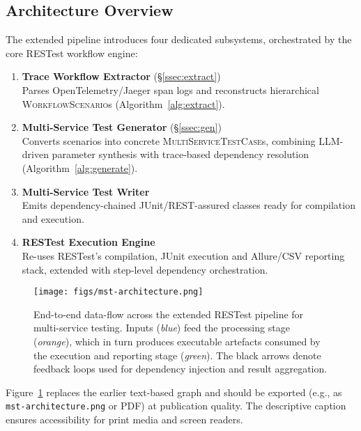 \subsection{Architecture Overview}\label{ssec:arch}
The extended pipeline introduces four dedicated subsystems, orchestrated by
the core RESTest workflow engine:

\begin{enumerate}[leftmargin=*]
  \item \textbf{Trace Workflow Extractor}  
        \hfill(\S\ref{ssec:extract})\\
        Parses OpenTelemetry/Jaeger span logs and reconstructs hierarchical
        \textsc{WorkflowScenario}s (Algorithm~\ref{alg:extract}).
  \item \textbf{Multi-Service Test Generator}  
        \hfill(\S\ref{ssec:gen})\\
        Converts scenarios into concrete \textsc{MultiServiceTestCase}s, combining
        LLM-driven parameter synthesis with trace-based dependency resolution
        (Algorithm~\ref{alg:generate}).
  \item \textbf{Multi-Service Test Writer}\\
        Emits dependency-chained JUnit/REST-assured classes ready for
        compilation and execution.
  \item \textbf{RESTest Execution Engine}\\
        Re-uses RESTest’s compilation, JUnit execution and Allure/CSV reporting
        stack, extended with step-level dependency orchestration.
\end{enumerate}

\begin{figure}[t]
  \centering
  \texttt{[image: figs/mst-architecture.png]}
  \caption{End-to-end data-flow across the extended RESTest pipeline for
           multi-service testing.  Inputs (\textit{blue}) feed the processing
           stage (\textit{orange}), which in turn produces executable artefacts
           consumed by the execution and reporting stage (\textit{green}).  The
           black arrows denote feedback loops used for dependency injection
           and result aggregation.}
  \label{fig:dataflow}
\end{figure}

\noindent%
Figure~\ref{fig:dataflow} replaces the earlier text-based graph and should be
exported (e.g., as \texttt{mst-architecture.png} or PDF) at publication
quality.  The descriptive caption ensures accessibility for print media and
screen readers.

